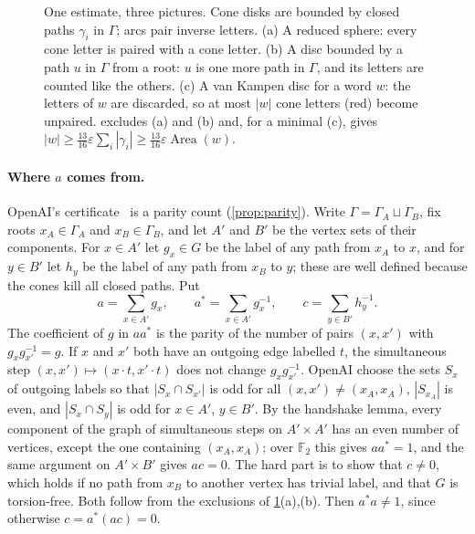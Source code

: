 \documentclass[11pt]{article}
\theoremstyle{definition}
\theoremstyle{plain}
\newcommand{\F}{\mathbb{F}}
\newcommand{\eps}{\varepsilon}
\newcommand{\Area}{\operatorname{Area}}
\begin{document}
\begin{figure}[!htb]
\caption{One estimate, three pictures. Cone disks are bounded by closed paths $\gamma_i$ in $\Gamma$; arcs pair inverse letters. (a) A reduced sphere: every cone letter is paired with a cone letter. (b) A disc bounded by a path $u$ in $\Gamma$ from a root: $u$ is one more path in $\Gamma$, and its letters are counted like the others. (c) A van Kampen disc for a word $w$: the letters of $w$ are discarded, so at most $|w|$ cone letters (red) become unpaired.  excludes (a) and (b) and, for a minimal (c), gives $|w|\ge\frac{13}{16}\eps\sum_i|\gamma_i|\ge\frac{13}{16}\eps\Area(w)$.}
\label{fig:idea}
\end{figure}

\paragraph{Where $a$ comes from.} OpenAI's certificate~\cite[Prop.~2.1]{OAI197a} is a parity count (\cref{prop:parity}). Write $\Gamma=\Gamma_A\sqcup\Gamma_B$, fix roots $x_A\in\Gamma_A$ and $x_B\in\Gamma_B$, and let $A'$ and $B'$ be the vertex sets of their components. For $x\in A'$ let $g_x\in G$ be the label of any path from $x_A$ to $x$, and for $y\in B'$ let $h_y$ be the label of any path from $x_B$ to $y$; these are well defined because the cones kill all closed paths. Put
\[
a=\sum_{x\in A'}g_x,\qquad a^*=\sum_{x\in A'}g_x^{-1},\qquad c=\sum_{y\in B'}h_y^{-1}.
\]
The coefficient of $g$ in $aa^*$ is the parity of the number of pairs $(x,x')$ with $g_xg_{x'}^{-1}=g$. If $x$ and $x'$ both have an outgoing edge labelled $t$, the simultaneous step $(x,x')\mapsto(x\cdot t,x'\cdot t)$ does not change $g_xg_{x'}^{-1}$. OpenAI choose the sets $S_x$ of outgoing labels so that $|S_x\cap S_{x'}|$ is odd for all $(x,x')\neq(x_A,x_A)$, $|S_{x_A}|$ is even, and $|S_x\cap S_y|$ is odd for $x\in A'$, $y\in B'$. By the handshake lemma, every component of the graph of simultaneous steps on $A'\times A'$ has an even number of vertices, except the one containing $(x_A,x_A)$; over $\F_2$ this gives $aa^*=1$, and the same argument on $A'\times B'$ gives $ac=0$. The hard part is to show that $c\neq0$, which holds if no path from $x_B$ to another vertex has trivial label, and that $G$ is torsion-free. Both follow from the exclusions of \cref{fig:idea}(a),(b). Then $a^*a\neq1$, since otherwise $c=a^*(ac)=0$.
\end{document}
